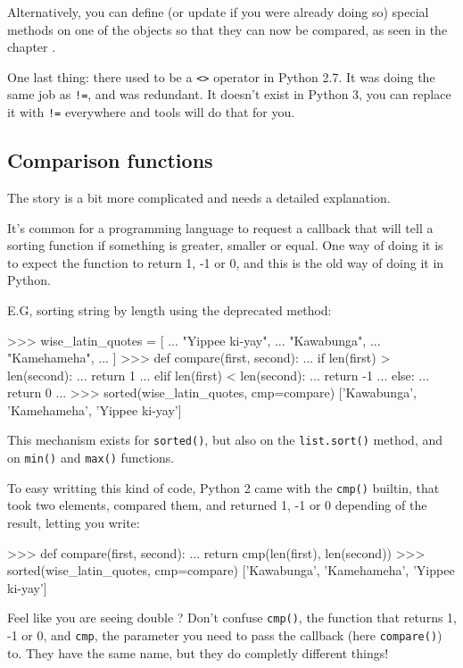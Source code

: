 Alternatively, you can define (or update if you were already doing so) special methods on one of the objects so that they can now be compared, as seen in the chapter .

One last thing: there used to be a \lstinline{<>} operator in Python 2.7. It was doing the same job as \lstinline{!=}, and was redundant. It doesn't exist in Python 3, you can replace it with \lstinline{!=} everywhere and tools will do that for you.

\subsection{Comparison functions}

The story is a bit more complicated and needs a detailed explanation.

It's common for a programming language to request a callback that will tell a sorting function if something is greater, smaller or equal. One way of doing it is to expect the function to return 1, -1 or 0, and this is the old way of doing it in Python.

E.G, sorting string by length using the deprecated method:

\begin{py2}
>>> wise_latin_quotes = [
...     "Yippee ki-yay",
...     "Kawabunga",
...     "Kamehameha",
... ]
>>> def compare(first, second):
...     if len(first) > len(second):
...         return 1
...     elif len(first) < len(second):
...         return -1
...     else:
...         return 0
...
>>> sorted(wise_latin_quotes, cmp=compare)
['Kawabunga', 'Kamehameha', 'Yippee ki-yay']
\end{py2}

This mechanism exists for \lstinline{sorted()}, but also on the \lstinline{list.sort()} method, and on \lstinline{min()} and \lstinline{max()} functions.

To easy writting this kind of code, Python 2 came with the \lstinline{cmp()} \gls{builtin}, that took two elements, compared them, and returned 1, -1 or 0 depending of the result, letting you write:

\begin{py2}
>>> def compare(first, second):
...     return cmp(len(first), len(second))
>>> sorted(wise_latin_quotes, cmp=compare)
['Kawabunga', 'Kamehameha', 'Yippee ki-yay']
\end{py2}

Feel like you are seeing double ? Don't confuse \lstinline{cmp()}, the function that returns 1, -1 or 0, and \lstinline{cmp}, the parameter you need to pass the callback (here \lstinline{compare()}) to. They have the same name, but they do completly different things!

